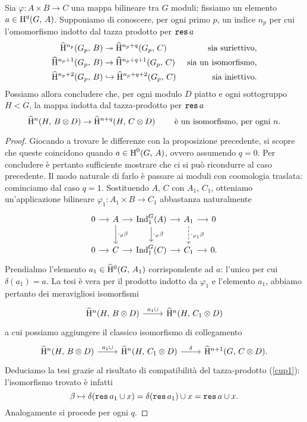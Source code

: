 \begin{proposition}
	Sia $ \varphi \colon A \times B \to C $ una mappa bilineare tra $ G $ moduli; fissiamo un elemento $ a \in \operatorname{H}^q(G, \, A) $. Supponiamo di conoscere, per ogni primo $ p $, un indice $ n_p $ per cui l'omomorfismo indotto dal tazza prodotto per $ \operatorname{\mathtt{res}} a $
	\begin{align*}
	\operatorname{\widehat{H}^{\mathnormal{n_p}}}(G_p,\, B) &\twoheadrightarrow \operatorname{\widehat{H}^{\mathnormal{n_p}+\mathnormal{q}}}(G_p,\, C) & \text{ sia suriettivo,} \\
	\operatorname{\widehat{H}^{\mathnormal{n_p}+1}}(G_p,\, B) &\to \operatorname{\widehat{H}^{\mathnormal{n_p}+\mathnormal{q}+1}}(G_p,\, C) & \text{ sia un isomorfismo,} \\
	\operatorname{\widehat{H}^{\mathnormal{n_p}+2}}(G_p,\, B) &\hookrightarrow \operatorname{\widehat{H}^{\mathnormal{n_p}+\mathnormal{q}+2}}(G_p,\, C) & \text{ sia iniettivo.}
	\end{align*}
	Possiamo allora concludere che, per ogni modulo $ D $ piatto e ogni sottogruppo $ H < G $, la mappa indotta dal tazza-prodotto per $ \operatorname{\mathtt{res}} a $
	\[ \operatorname{\widehat{H}^{\mathnormal{n}}}(H, \, B \otimes D) \to \operatorname{\widehat{H}^{\mathnormal{n}+\mathnormal{q}}}(H, \,  C\otimes D) \qquad\text{ è un isomorfismo, per ogni } n. \]
\end{proposition}

\begin{proof}
	Giocando a trovare le differenze con la proposizione precedente, si scopre che queste coincidono quando $ a \in \operatorname{H}^0(G, \, A) $, ovvero assumendo $ q = 0. $ Per concludere è pertanto sufficiente mostrare che ci si può ricondurre al caso precedente. Il modo naturale di farlo è passare ai moduli con coomologia traslata: cominciamo dal caso $ q = 1 $. Sostituendo $ A, \, C $ con $ A_1 ,\,  C_1 $, otteniamo un'applicazione bilineare $ \varphi_1\colon A_1 \times B \to C_1 $ abbastanza naturalmente
	\[ \begin{tikzcd}[column sep = small]
	0 \rar
	& A \rar \dar["\cdot_\varphi\beta"]
	& \Ind_1^G(A) \rar \dar["\cdot_\varphi\beta"]
	& A_1 \rar \dar["\cdot_{\varphi_1}\beta", dashed]
	& 0\\
	0 \rar & C \rar & \Ind_1^G(C) \rar & C_1 \rar & 0.  \end{tikzcd} \]
	Prendialmo l'elemento $ a_1 \in \operatorname{\widehat{H}^{0}}(G, \, A_1) $ corrispondente ad $ a $: l'unico per cui $ \delta(a_1) = a $. La tesi è vera per il prodotto indotto da $ \varphi_1 $ e l'elemento $ a_1 $, abbiamo pertanto dei meravigliosi isomorfismi
	\[ \begin{tikzcd}
	\Hhn(H, \, B \otimes D) \rar["a_1\cup"] & \Hhn(H, \,  C_1 \otimes D)
	\end{tikzcd}  \]
	a cui possiamo aggiungere il classico isomorfismo di collegamento
	\[ \begin{tikzcd}
	\Hhn(H, \, B \otimes D) \rar["a_1\cup"] & \Hhn(H, \,  C_1 \otimes D) \rar["\delta"] & \Hhnu(G, \, C \otimes D).
	\end{tikzcd}  \]
	Deduciamo la tesi grazie al risultato di compatibilità del tazza-prodotto (\ref{cup1}): l'isomorfismo trovato è infatti $$  \beta \mapsto \delta(\operatorname{\mathtt{res}} a_1 \cup x) = \delta(\operatorname{\mathtt{res}} a_1) \cup x = \operatorname{\mathtt{res}} a \cup x.  $$ Analogamente si procede per ogni $ q $.
\end{proof}

